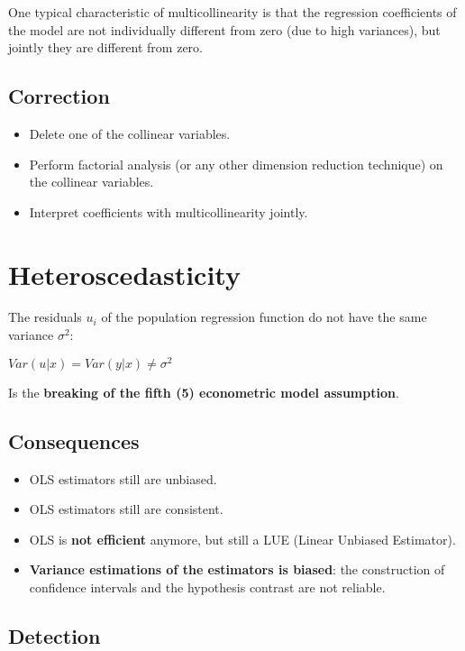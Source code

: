 \documentclass[10pt, a4paper, landscape]{extarticle}
\begin{document}
\begin{multicols}{3}
One typical characteristic of multicollinearity is that the regression coefficients of the model are not individually different from zero (due to high variances), but jointly they are different from zero.

\subsection*{Correction}

\begin{itemize}[leftmargin=*]
\item Delete one of the collinear variables.
\item Perform factorial analysis (or any other dimension reduction technique) on the collinear variables.
\item Interpret coefficients with multicollinearity jointly.
\end{itemize}

\columnbreak

\section*{Heteroscedasticity}

The residuals $u_i$ of the population regression function do not have the same variance $\sigma^2$:

\begin{center}
$Var(u|x) = Var(y|x) \neq \sigma^2$
\end{center}

Is the \textbf{breaking of the fifth (5) econometric model assumption}.

\subsection*{Consequences}

\begin{itemize}[leftmargin=*]
\item OLS estimators still are unbiased.
\item OLS estimators still are consistent.
\item OLS is \textbf{not efficient} anymore, but still a LUE (Linear Unbiased Estimator).
\item \textbf{Variance estimations of the estimators is biased}: the construction of confidence intervals and the hypothesis contrast are not reliable.
\end{itemize}

\subsection*{Detection}


\end{multicols}
\end{document}
